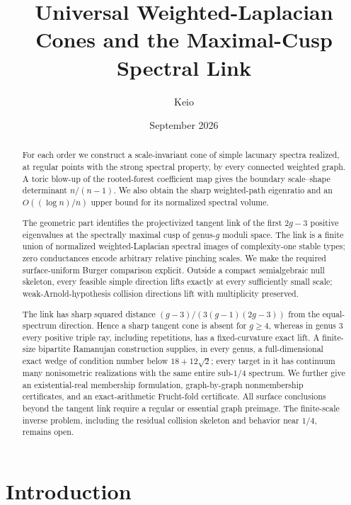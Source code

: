 \documentclass[11pt,reqno]{amsart}
\title[Universal Cones and Maximal-Cusp Spectral Links]{Universal
  Weighted-Laplacian Cones and the Maximal-Cusp Spectral Link}
\author{Keio}
\date{September 2026}
\theoremstyle{definition}
\theoremstyle{remark}
\begin{document}
\begin{abstract}
For each order we construct a scale-invariant cone of simple lacunary spectra
realized, at regular points with the strong spectral property, by every
connected weighted graph.  A toric blow-up of the rooted-forest coefficient
map gives the boundary scale--shape determinant $n/(n-1)$.  We also obtain the
sharp weighted-path eigenratio and an $O((\log n)/n)$ upper bound for its
normalized spectral volume.

The geometric part identifies the projectivized tangent link of the first
$2g-3$ positive eigenvalues at the spectrally maximal cusp of genus-$g$
moduli space.  The link is a finite union of normalized weighted-Laplacian
spectral images of complexity-one stable types; zero conductances encode
arbitrary relative pinching scales.  We make the required surface-uniform
Burger comparison explicit.  Outside a compact semialgebraic null skeleton,
every feasible simple direction lifts exactly at every sufficiently small
scale; weak-Arnold-hypothesis collision directions lift with multiplicity
preserved.

The link has sharp squared distance
$({g-3})/{(3(g-1)(2g-3))}$ from the equal-spectrum direction.  Hence a sharp
tangent cone is absent for $g\ge4$, whereas in genus $3$ every positive triple
ray, including repetitions, has a fixed-curvature exact lift.  A finite-size
bipartite Ramanujan construction supplies, in every genus, a full-dimensional
exact wedge of condition number below $18+12\sqrt2$; every target in it has
continuum many nonisometric realizations with the same entire sub-$1/4$
spectrum.  We further give an existential-real membership formulation,
graph-by-graph nonmembership certificates, and an exact-arithmetic
Frucht-fold certificate.  All surface conclusions beyond the tangent link
require a regular or essential graph preimage.  The finite-scale inverse
problem, including the residual collision skeleton and behavior near $1/4$,
remains open.
\end{abstract}

\maketitle

\section{Introduction}
\end{document}
